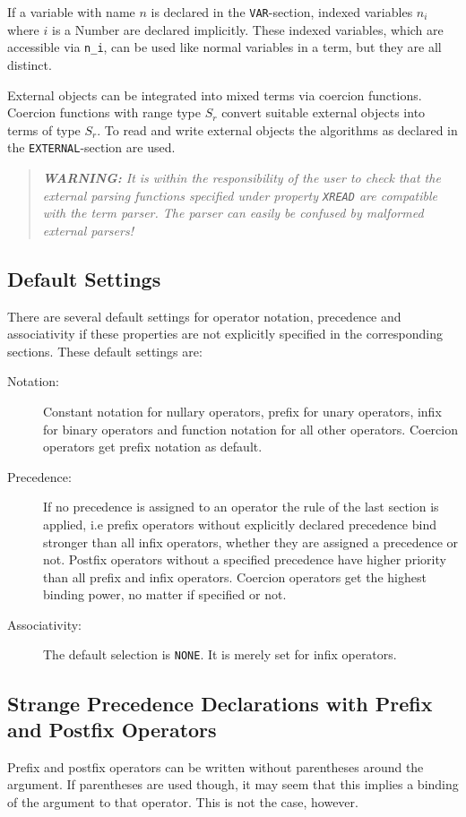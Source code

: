 If a variable with name $n$ is declared in the {\tt VAR}-section,
indexed variables $n_i$ where $i$ is a {\vs Number} are declared
implicitly. These indexed variables, which are accessible via
{\tt n\_i}, can be used like normal variables
in a term, but they are all distinct.

External objects can be integrated into mixed terms via coercion functions.
Coercion functions with range type $S_r$ convert suitable external objects
into terms of type $S_r$. To read and write external objects the algorithms
as declared in the {\tt EXTERNAL}-section are used.
\begin{quote}
{\em
{\bf WARNING:} It is within the responsibility of the user to check that
the external parsing functions specified under property {\tt XREAD} are
compatible with the term parser. The parser can easily be confused
by malformed external parsers!
} %
\end{quote}

\subsection{Default Settings}
There are several default settings for operator notation, precedence and associativity
if these properties are not explicitly specified in the corresponding
sections. These default settings are:

\begin{description}
\item[Notation:]
Constant notation for nullary operators, prefix for unary operators,
infix for binary operators and function notation for all other operators.
Coercion operators get prefix notation as default.
\item[Precedence:]
If no precedence is assigned to an operator the rule of the last section
is applied, i.e prefix operators without explicitly declared precedence
bind stronger than all infix operators, whether they are assigned a
precedence or not. Postfix operators without a specified precedence have
higher priority than all prefix and infix operators. Coercion operators
get the highest binding power, no matter if specified or not.
\item[Associativity:]
The default selection is {\tt NONE}. It is merely set for infix operators.
\end{description}

\subsection{Strange Precedence Declarations with Prefix and Postfix Operators}
\label{strangeprec}
Prefix and postfix operators can be written without parentheses around
the argument. If parentheses are used though, it may seem that this implies
a binding of the argument to that operator. This is not the case, however.

